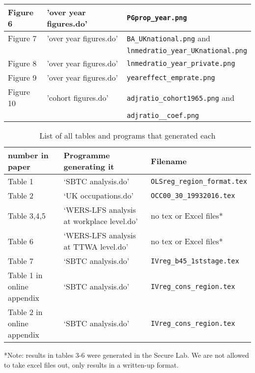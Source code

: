 \documentclass[12pt]{article}
\begin{document}
\begin{table}[h]
\begin{tabular}{l l l}
\hline
Figure 6 &'over year figures.do' &  \texttt{PGprop\_year.png} \\
\hline
Figure 7 &'over year figures.do' &  \texttt{BA\_UKnational.png} and\\
&& \texttt{lnmedratio\_year\_UKnational.png}\\
\hline
Figure 8 &'over year figures.do' &  \texttt{lnmedratio\_year\_private.png}\\
\hline
Figure 9 &'over year figures.do' &  \texttt{yeareffect\_emprate.png} \\
\hline
Figure 10 & 'cohort figures.do’ & \texttt{adjratio\_cohort1965.png} and\\
&& \texttt{adjratio\_\_coef.png}\\
\hline
\end{tabular}
\end{table}


\begin{table}[h]
\centering
\caption{List of all tables and programs that generated each}
\label{tab:tables}
\begin{tabular}{l l l}
\hline
number in paper & Programme generating it & Filename\\
\hline
Table 1 & ‘SBTC analysis.do’ &\texttt{OLSreg\_region\_format.tex}\\
\hline
Table 2 & ‘UK occupations.do’& \texttt{OCC00\_30\_19932016.tex}\\
\hline
Table 3,4,5 & `WERS-LFS analysis at workplace level.do' & no tex or Excel files*\\
Table 6 & `WERS-LFS analysis at TTWA level.do' & no tex or Excel files*\\
\hline
Table 7 & ‘SBTC analysis.do’ &\texttt{IVreg\_b45\_1ststage.tex }\\
\hline
Table 1 in online appendix & ‘SBTC analysis.do’ &\texttt{IVreg\_cons\_region.tex}\\
Table 2 in online appendix & ‘SBTC analysis.do’ &\texttt{IVreg\_cons\_region.tex}\\
\hline
\end{tabular}
*Note: results in tables 3-6 were generated in the Secure Lab. We are not allowed to take excel files out, only results in a written-up format.
\end{table}
\end{document}
